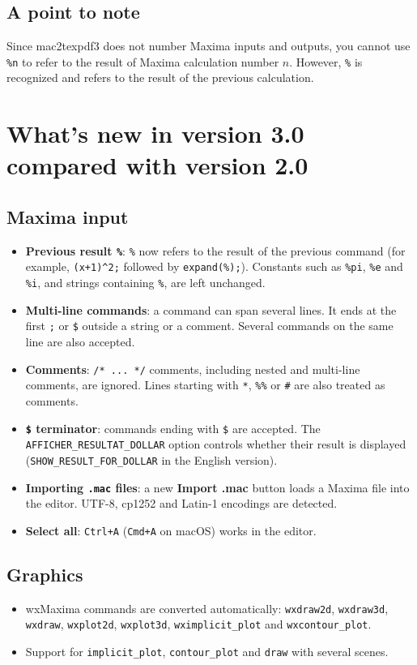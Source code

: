 \documentclass[a4paper,11pt]{article}
\newcounter{num}
\begin{document}
\subsection*{A point to note}
Since mac2texpdf3 does not number Maxima inputs and outputs, you cannot use \verb|%n| to refer to the result of Maxima calculation number $n$. However, \verb|%| is recognized and refers to the result of the previous calculation.

\section*{What's new in version 3.0 compared with version 2.0}
\subsection*{Maxima input}
\begin{itemize}
\item \textbf{Previous result \texttt{\%}}: \verb|%| now refers to the result of the previous command (for example, \verb|(x+1)^2;| followed by \verb|expand(%);|). Constants such as \verb|%pi|, \verb|%e| and \verb|%i|, and strings containing \verb|%|, are left unchanged.
\item \textbf{Multi-line commands}: a command can span several lines. It ends at the first \verb|;| or \verb|$| outside a string or a comment. Several commands on the same line are also accepted.
\item \textbf{Comments}: \verb|/* ... */| comments, including nested and multi-line comments, are ignored. Lines starting with \verb|*|, \verb|%%| or \verb|#| are also treated as comments.
\item \textbf{\texttt{\$} terminator}: commands ending with \verb|$| are accepted. The \verb|AFFICHER_RESULTAT_DOLLAR| option controls whether their result is displayed (\verb|SHOW_RESULT_FOR_DOLLAR| in the English version).
\item \textbf{Importing \texttt{.mac} files}: a new \textbf{Import .mac} button loads a Maxima file into the editor. UTF-8, cp1252 and Latin-1 encodings are detected.
\item \textbf{Select all}: \texttt{Ctrl+A} (\texttt{Cmd+A} on macOS) works in the editor.
\end{itemize}

\subsection*{Graphics}
\begin{itemize}
\item wxMaxima commands are converted automatically: \texttt{wxdraw2d}, \texttt{wxdraw3d}, \texttt{wxdraw}, \texttt{wxplot2d}, \texttt{wxplot3d}, \verb|wximplicit_plot| and \verb|wxcontour_plot|.
\item Support for \verb|implicit_plot|, \verb|contour_plot| and \texttt{draw} with several scenes.
\end{itemize}
\end{document}
